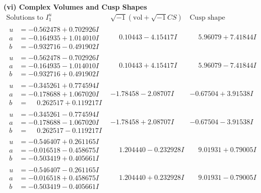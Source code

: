 \documentclass[1p]{elsarticle_modified}
\theoremstyle{definition}
\newcommand{\I}{\sqrt{-1}}
\begin{document}
\newpage\flushleft \textbf{(vi) Complex Volumes and Cusp Shapes}
$$\begin{array}{c|c|c}  
\text{Solutions to }I^u_{1}& \I (\text{vol} + \sqrt{-1}CS) & \text{Cusp shape}\\
 \hline 
\begin{aligned}
u &= -0.562478 + 0.702926 I \\
a &= -0.164935 + 1.014010 I \\
b &= -0.932716 - 0.491902 I\end{aligned}
 & \phantom{-}0.10443 - 4.15417 I & \phantom{-}5.96079 + 7.41844 I \\ \hline\begin{aligned}
u &= -0.562478 - 0.702926 I \\
a &= -0.164935 - 1.014010 I \\
b &= -0.932716 + 0.491902 I\end{aligned}
 & \phantom{-}0.10443 + 4.15417 I & \phantom{-}5.96079 - 7.41844 I \\ \hline\begin{aligned}
u &= -0.345261 + 0.774594 I \\
a &= -0.178688 + 1.067020 I \\
b &= \phantom{-}0.262517 + 0.119217 I\end{aligned}
 & -1.78458 - 2.08707 I & -0.67504 + 3.91538 I \\ \hline\begin{aligned}
u &= -0.345261 - 0.774594 I \\
a &= -0.178688 - 1.067020 I \\
b &= \phantom{-}0.262517 - 0.119217 I\end{aligned}
 & -1.78458 + 2.08707 I & -0.67504 - 3.91538 I \\ \hline\begin{aligned}
u &= -0.546407 + 0.261165 I \\
a &= -0.016518 - 0.458675 I \\
b &= -0.503419 + 0.405661 I\end{aligned}
 & \phantom{-}1.204440 - 0.232928 I & \phantom{-}9.01931 + 0.79005 I \\ \hline\begin{aligned}
u &= -0.546407 - 0.261165 I \\
a &= -0.016518 + 0.458675 I \\
b &= -0.503419 - 0.405661 I\end{aligned}
 & \phantom{-}1.204440 + 0.232928 I & \phantom{-}9.01931 - 0.79005 I \\ \hline\begin{aligned}

\end{aligned}
\end{array}$$
\end{document}
